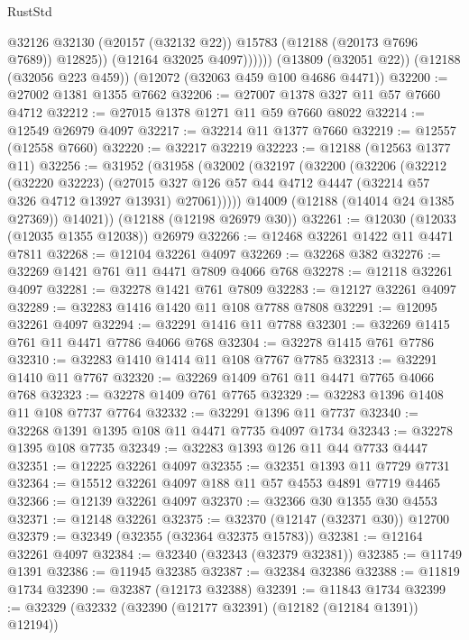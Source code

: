 \begin{lexlean}{RustStd}
\begin{coremodule}
                  @32126
                  @32130
                  (@20157 (@32132 @22))
                  @15783
                  (@12188 (@20173 @7696 @7689))
                  @12825))
              (@12164 @32025 @4097))))))
    (@13809 (@32051 @22))
    (@12188 (@32056 @223 @459))
    (@12072 (@32063 @459 @100 @4686 @4471))
@32200 := @27002 @1381 @1355 @7662
@32206 := @27007 @1378 @327 @11 @57 @7660 @4712
@32212 := @27015 @1378 @1271 @11 @59 @7660 @8022
@32214 := @12549 @26979 @4097
@32217 := @32214 @11 @1377 @7660
@32219 := @12557 (@12558 @7660)
@32220 := @32217 @32219
@32223 := @12188 (@12563 @1377 @11)
@32256 := @31952
    (@31958
      (@32002
        (@32197
          (@32200
            (@32206
              (@32212
                (@32220 @32223)
                (@27015
                  @327
                  @126
                  @57
                  @44
                  @4712
                  @4447
                  (@32214 @57 @326 @4712 @13927 @13931)
                  @27061)))))
        @14009
        (@12188 (@14014 @24 @1385 @27369))
        @14021))
    (@12188 (@12198 @26979 @30))
@32261 := @12030 (@12033 (@12035 @1355 @12038)) @26979
@32266 := @12468 @32261 @1422 @11 @4471 @7811
@32268 := @12104 @32261 @4097
@32269 := @32268 @382
@32276 := @32269 @1421 @761 @11 @4471 @7809 @4066 @768
@32278 := @12118 @32261 @4097
@32281 := @32278 @1421 @761 @7809
@32283 := @12127 @32261 @4097
@32289 := @32283 @1416 @1420 @11 @108 @7788 @7808
@32291 := @12095 @32261 @4097
@32294 := @32291 @1416 @11 @7788
@32301 := @32269 @1415 @761 @11 @4471 @7786 @4066 @768
@32304 := @32278 @1415 @761 @7786
@32310 := @32283 @1410 @1414 @11 @108 @7767 @7785
@32313 := @32291 @1410 @11 @7767
@32320 := @32269 @1409 @761 @11 @4471 @7765 @4066 @768
@32323 := @32278 @1409 @761 @7765
@32329 := @32283 @1396 @1408 @11 @108 @7737 @7764
@32332 := @32291 @1396 @11 @7737
@32340 := @32268 @1391 @1395 @108 @11 @4471 @7735 @4097 @1734
@32343 := @32278 @1395 @108 @7735
@32349 := @32283 @1393 @126 @11 @44 @7733 @4447
@32351 := @12225 @32261 @4097
@32355 := @32351 @1393 @11 @7729 @7731
@32364 := @15512 @32261 @4097 @188 @11 @57 @4553 @4891 @7719 @4465
@32366 := @12139 @32261 @4097
@32370 := @32366 @30 @1355 @30 @4553
@32371 := @12148 @32261
@32375 := @32370 (@12147 (@32371 @30)) @12700
@32379 := @32349 (@32355 (@32364 @32375 @15783))
@32381 := @12164 @32261 @4097
@32384 := @32340 (@32343 (@32379 @32381))
@32385 := @11749 @1391
@32386 := @11945 @32385
@32387 := @32384 @32386
@32388 := @11819 @1734
@32390 := @32387 (@12173 @32388)
@32391 := @11843 @1734
@32399 := @32329 (@32332 (@32390 (@12177 @32391) (@12182 (@12184 @1391)) @12194))

\end{coremodule}
\end{lexlean}

